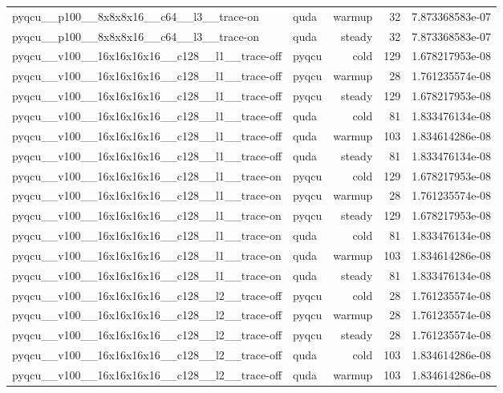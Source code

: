 \begin{table}[htbp]
\begin{tabular}{@{}llrrr@{}}
pyqcu\_\_p100\_\_8x8x8x16\_\_c64\_\_l3\_\_trace-on & quda & warmup & 32 & 7.873368583e-07 \\
pyqcu\_\_p100\_\_8x8x8x16\_\_c64\_\_l3\_\_trace-on & quda & steady & 32 & 7.873368583e-07 \\
pyqcu\_\_v100\_\_16x16x16x16\_\_c128\_\_l1\_\_trace-off & pyqcu & cold & 129 & 1.678217953e-08 \\
pyqcu\_\_v100\_\_16x16x16x16\_\_c128\_\_l1\_\_trace-off & pyqcu & warmup & 28 & 1.761235574e-08 \\
pyqcu\_\_v100\_\_16x16x16x16\_\_c128\_\_l1\_\_trace-off & pyqcu & steady & 129 & 1.678217953e-08 \\
pyqcu\_\_v100\_\_16x16x16x16\_\_c128\_\_l1\_\_trace-off & quda & cold & 81 & 1.833476134e-08 \\
pyqcu\_\_v100\_\_16x16x16x16\_\_c128\_\_l1\_\_trace-off & quda & warmup & 103 & 1.834614286e-08 \\
pyqcu\_\_v100\_\_16x16x16x16\_\_c128\_\_l1\_\_trace-off & quda & steady & 81 & 1.833476134e-08 \\
pyqcu\_\_v100\_\_16x16x16x16\_\_c128\_\_l1\_\_trace-on & pyqcu & cold & 129 & 1.678217953e-08 \\
pyqcu\_\_v100\_\_16x16x16x16\_\_c128\_\_l1\_\_trace-on & pyqcu & warmup & 28 & 1.761235574e-08 \\
pyqcu\_\_v100\_\_16x16x16x16\_\_c128\_\_l1\_\_trace-on & pyqcu & steady & 129 & 1.678217953e-08 \\
pyqcu\_\_v100\_\_16x16x16x16\_\_c128\_\_l1\_\_trace-on & quda & cold & 81 & 1.833476134e-08 \\
pyqcu\_\_v100\_\_16x16x16x16\_\_c128\_\_l1\_\_trace-on & quda & warmup & 103 & 1.834614286e-08 \\
pyqcu\_\_v100\_\_16x16x16x16\_\_c128\_\_l1\_\_trace-on & quda & steady & 81 & 1.833476134e-08 \\
pyqcu\_\_v100\_\_16x16x16x16\_\_c128\_\_l2\_\_trace-off & pyqcu & cold & 28 & 1.761235574e-08 \\
pyqcu\_\_v100\_\_16x16x16x16\_\_c128\_\_l2\_\_trace-off & pyqcu & warmup & 28 & 1.761235574e-08 \\
pyqcu\_\_v100\_\_16x16x16x16\_\_c128\_\_l2\_\_trace-off & pyqcu & steady & 28 & 1.761235574e-08 \\
pyqcu\_\_v100\_\_16x16x16x16\_\_c128\_\_l2\_\_trace-off & quda & cold & 103 & 1.834614286e-08 \\
pyqcu\_\_v100\_\_16x16x16x16\_\_c128\_\_l2\_\_trace-off & quda & warmup & 103 & 1.834614286e-08 \\

\end{tabular}
\end{table}
